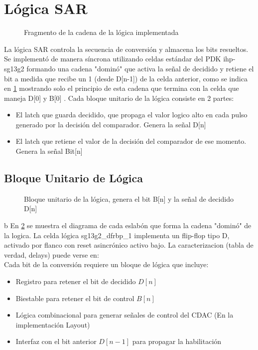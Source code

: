 \documentclass[12pt,a4paper]{report}
\begin{document}
\section{Lógica SAR}
\begin{figure}[H]
    \centering
    
    \caption{Fragmento de la cadena de la lógica implementada}
        \label{logfrag}
\end{figure}
La lógica SAR controla la secuencia de conversión y almacena los bits resueltos. Se implementó de manera síncrona utilizando celdas estándar del PDK ihp-sg13g2 formando una cadena "dominó" que activa la señal de decidido y retiene el bit a medida que recibe un 1 (desde D[n-1]) de la celda anterior, como se indica en \cref{logfrag} mostrando solo el principio de esta cadena que termina con la celda que maneja D[0] y B[0] .
Cada bloque unitario de la lógica consiste en 2 partes:
\begin{itemize}
\item El latch que guarda decidido, que propaga el valor logico alto en cada pulso generado por la decisión del comparador. Genera la señal D[n]

\item El latch que retiene el valor de la decisión del comparador de ese momento. Genera la señal Bit[n]
\end{itemize}


\subsection{Bloque Unitario de Lógica}

\begin{figure}[H]
    \centering
    
    \caption{Bloque unitario de la lógica, genera el bit B[n] y la señal de decidido D[n]}
        \label{logunitbit}
\end{figure}b
En \cref{logunitbit} se muestra el diagrama de cada eslabón que forma la cadena "dominó" de la logica.
La celda lógica sg13g2\_dfrbp\_1 implementa un flip-flop tipo D, activado por flanco con reset asincrónico activo bajo. La caracterizacion (tabla de verdad, delays) puede verse en:  \cite{IHP-sg13g2}\\

Cada bit de la conversión requiere un bloque de lógica que incluye:
\begin{itemize}
    \item Registro para retener el bit de decidido $D[n]$
    \item Biestable para retener el bit de control $B[n]$
    \item Lógica combinacional para generar señales de control del CDAC (En la implementación Layout)
    \item Interfaz con el bit anterior $D[n-1]$ para propagar la habilitación
\end{itemize}
\end{document}
